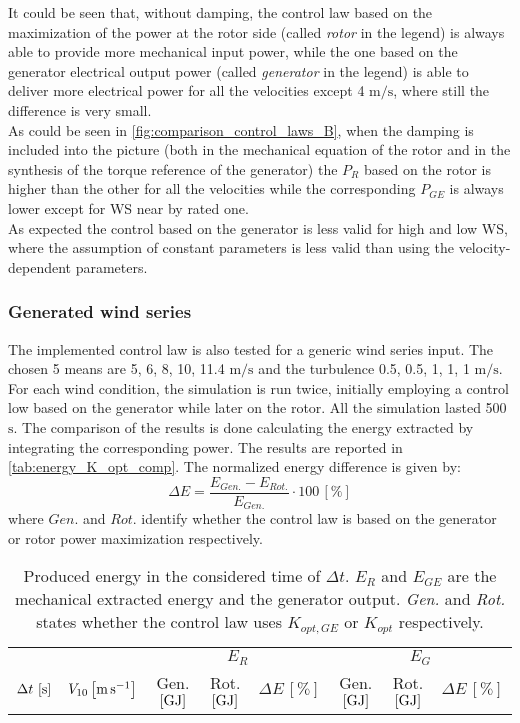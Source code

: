 It could be seen that, without damping, the control law based on the maximization of the power at the rotor side (called \textit{rotor} in the legend) is always able to provide more mechanical input power, while the one based on the generator electrical output power (called \textit{generator} in the legend) is able to deliver more electrical power for all the velocities except 4 $\si{\meter\per\second}$, where still the difference is very small.  \\
As could be seen in \autoref{fig:comparison_control_laws_B}, when the damping is included into the picture (both in the mechanical equation of the rotor and in the synthesis of the torque reference of the generator) the $P_R$ based on the rotor is higher than the other for all the velocities while the corresponding $P_{GE}$ is always lower except for WS near by rated one.\\
As expected the control based on the generator is less valid for high and low WS, where the assumption of constant parameters is less valid than using the velocity-dependent parameters. 

\subsubsection{Generated wind series}
The implemented control law is also tested for a generic wind series input. The chosen 5 means are 5, 6, 8, 10, 11.4 $\si{\meter\per\second}$ and the turbulence 0.5, 0.5, 1, 1, 1 $\si{\meter\per\second}$. For each wind condition, the simulation is run twice, initially employing a control low based on the generator while later on the rotor. All the simulation lasted 500 $\si{\second}$. The comparison of the results is done calculating the energy extracted by integrating the corresponding power. The results are reported in \autoref{tab:energy_K_opt_comp}. The normalized energy difference is given by:
\begin{equation}
  \Delta E = \frac{E_{Gen.} - E_{Rot.}}{E_{Gen.}}\cdot 100 \, \left[\%\right]
\end{equation}
where $Gen.$ and $Rot.$ identify whether the control law is based on the generator or rotor power maximization respectively.
\begin{table}[!htbp]
  \centering
  \caption{Produced energy in the considered time of $\Delta t$. $E_R$ and $E_{GE}$ are the mechanical extracted energy and the generator output. \textit{Gen.} and \textit{Rot.} states whether the control law uses $K_{opt,GE}$ or $K_{opt}$ respectively. }
  \begin{tabular}{cc|ccc|ccc}
    \toprule
    & & \multicolumn{3}{c|}{$E_R$} & \multicolumn{3}{c}{$E_G$} \\
     $\Delta t \,\left[\si{\second}\right]$ &  $V_{10} \left[\si{\meter\per\second}\right]$ & Gen. $\left[\si{\giga\joule}\right]$ & Rot. $\left[\si{\giga\joule}\right]$ & $\Delta E \, \left[\%\right]$ & Gen. $\left[\si{\giga\joule}\right]$ & Rot. $\left[\si{\giga\joule}\right]$ & $\Delta E \, \left[\%\right]$ \\ \midrule
    
  \end{tabular}
  \label{tab:energy_K_opt_comp}
\end{table}

